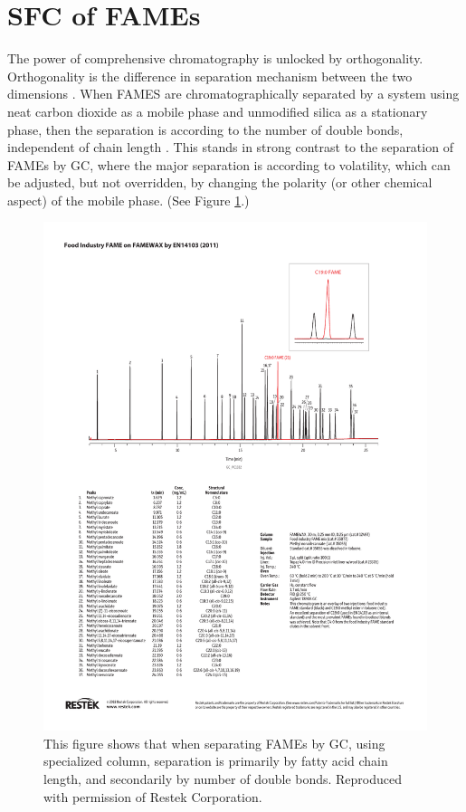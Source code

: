 \section{SFC of FAMEs}

The power of comprehensive chromatography is unlocked by orthogonality.
Orthogonality is the difference in separation mechanism between the two
dimensions \autocite{Marriott2012}. When FAMES are chromatographically separated
by a system using neat carbon dioxide as a mobile phase and unmodified silica as
a stationary phase, then the separation is according to the number of double
bonds, independent of chain length \autocite{Robertson1991, Smith1994,
Smith2001}. This stands in strong contrast to the separation of FAMEs by GC,
where the major separation is according to volatility, which can be adjusted,
but not overridden, by changing the polarity (or other chemical aspect) of the
mobile phase. (See Figure \ref{fig:RestekFAMEsGC}.)

\begin{figure}
\centering
\includegraphics[width=\textwidth]{Figures/GC_PC1332.pdf}
\decoRule

\caption[Separation of FAME by GC]{This figure shows that when separating FAMEs
by GC, using specialized column, separation is primarily by fatty acid chain
length, and secondarily by number of double bonds. Reproduced with permission of Restek Corporation.}

\label{fig:RestekFAMEsGC}
\end{figure}

